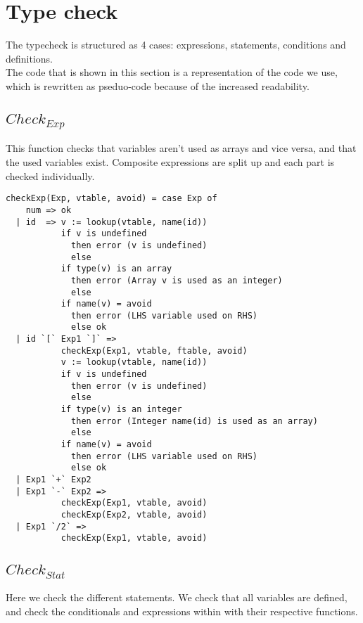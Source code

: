 \section{Type check}

The typecheck is structured as 4 cases: expressions, statements, conditions and definitions. \\
The code that is shown in this section is a representation of the code we use, 
which is rewritten as pseduo-code because of the increased readability.

\subsection{$Check_{Exp}$}

This function checks that variables aren't used as arrays and vice versa,
and that the used variables exist. Composite expressions are split up
and each part is checked individually. \\

\begin{verbatim}
checkExp(Exp, vtable, avoid) = case Exp of
    num => ok
  | id  => v := lookup(vtable, name(id))
           if v is undefined
             then error (v is undefined)
             else
           if type(v) is an array
             then error (Array v is used as an integer)
             else
           if name(v) = avoid
             then error (LHS variable used on RHS)
             else ok
  | id `[` Exp1 `]` =>
           checkExp(Exp1, vtable, ftable, avoid)
           v := lookup(vtable, name(id))
           if v is undefined
             then error (v is undefined)
             else
           if type(v) is an integer
             then error (Integer name(id) is used as an array)
             else
           if name(v) = avoid
             then error (LHS variable used on RHS)
             else ok
  | Exp1 `+` Exp2
  | Exp1 `-` Exp2 =>
           checkExp(Exp1, vtable, avoid)
           checkExp(Exp2, vtable, avoid)
  | Exp1 `/2` =>
           checkExp(Exp1, vtable, avoid)
\end{verbatim}

\subsection{$Check_{Stat}$}

Here we check the different statements. We check that all variables are
defined, and check the conditionals and expressions within with their
respective functions. \\

